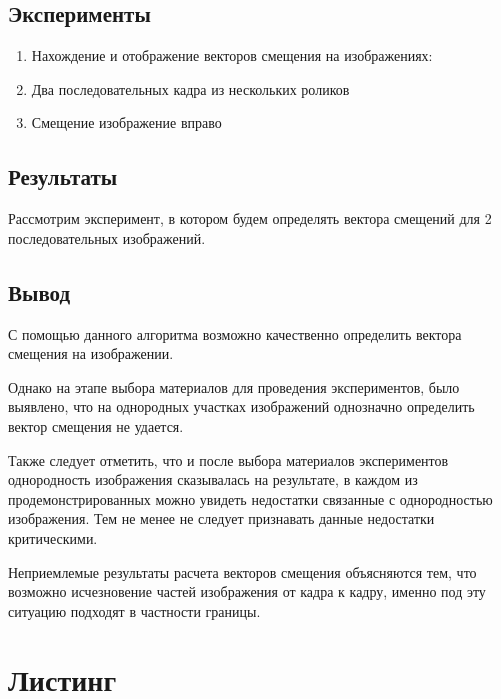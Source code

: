 \documentclass[14pt,a4paper,report]{report}
\begin{document}
\section{Эксперименты}
\begin{enumerate}
	\item Нахождение и отображение векторов смещения на изображениях:
	\item Два последовательных кадра из нескольких роликов
	\item Смещение изображение вправо 
\end{enumerate}

\clearpage

\section{Результаты}
Рассмотрим эксперимент, в котором будем определять вектора смещений для 2 последовательных изображений. 

\section{Вывод}
С помощью данного алгоритма возможно качественно определить вектора смещения на изображении. 

Однако на этапе выбора материалов для проведения экспериментов, было выявлено, что на однородных участках изображений однозначно определить вектор смещения не удается. 

Также следует отметить, что и после выбора материалов экспериментов однородность изображения сказывалась на результате, в каждом из продемонстрированных можно увидеть недостатки связанные с однородностью изображения. Тем не менее не следует признавать данные недостатки критическими.

Неприемлемые результаты расчета векторов смещения объясняются тем, что возможно исчезновение частей изображения от кадра к кадру, именно под эту ситуацию подходят в частности границы. 
	
\chapter{Листинг}
	

\end{document}
